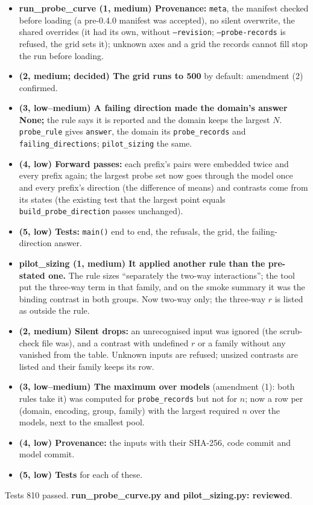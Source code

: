 \documentclass{article}
\begin{document}
\begin{itemize}
  \item \textbf{run\_probe\_curve (1, medium) Provenance:} \texttt{meta}, the manifest checked before loading (a
        pre-0.4.0 manifest was accepted), no silent overwrite, the shared overrides (it had its own, without
        \texttt{--revision}; \texttt{--probe-records} is refused, the grid sets it); unknown axes and a grid the records
        cannot fill stop the run before loading.
  \item \textbf{(2, medium; decided) The grid runs to 500} by default: amendment (2) confirmed.
  \item \textbf{(3, low--medium) A failing direction made the domain's answer None;} the rule says it is reported and
        the domain keeps the largest $N$. \texttt{probe\_rule} gives \texttt{answer}, the domain its
        \texttt{probe\_records} and \texttt{failing\_directions}; \texttt{pilot\_sizing} the same.
  \item \textbf{(4, low) Forward passes:} each prefix's pairs were embedded twice and every prefix again; the largest
        probe set now goes through the model once and every prefix's direction (the difference of means) and
        contrasts come from its states (the existing test that the largest point equals \texttt{build\_probe\_direction}
        passes unchanged).
  \item \textbf{(5, low) Tests:} \texttt{main()} end to end, the refusals, the grid, the failing-direction answer.
  \item \textbf{pilot\_sizing (1, medium) It applied another rule than the pre-stated one.} The rule sizes ``separately
        the two-way interactions''; the tool put the three-way term in that family, and on the smoke summary it was
        the binding contrast in both groups. Now two-way only; the three-way $r$ is listed as outside the rule.
  \item \textbf{(2, medium) Silent drops:} an unrecognised input was ignored (the scrub-check file was), and a
        contrast with undefined $r$ or a family without any vanished from the table. Unknown inputs are refused;
        unsized contrasts are listed and their family keeps its row.
  \item \textbf{(3, low--medium) The maximum over models} (amendment (1): both rules take it) was computed for
        \texttt{probe\_records} but not for $n$; now a row per (domain, encoding, group, family) with the largest
        required $n$ over the models, next to the smallest pool.
  \item \textbf{(4, low) Provenance:} the inputs with their SHA-256, code commit and model commit.
  \item \textbf{(5, low) Tests} for each of these.
\end{itemize}
Tests 810 passed. \textbf{run\_probe\_curve.py and pilot\_sizing.py: reviewed}.
\end{document}
